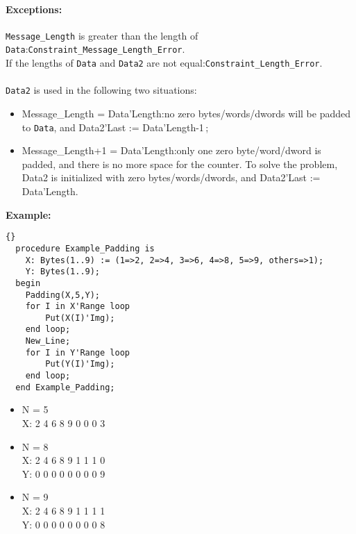 \paragraph{Exceptions:}
\texttt{Message\_Length} is greater than the length of
\texttt{Data}:\quad\texttt{Constraint\_Message\_Length\-\_Error}.\\ If
the lengths of \texttt{Data} and \texttt{Data2} are not
equal:\quad\texttt{Constraint\_Length\_Error}.\\ \ \\ 
\texttt{Data2} is used in the following two situations:
\begin{itemize}
\item Message\_Length = Data'Length:\quad no zero bytes/words/dwords
  will be padded to \texttt{Data}, and Data2'Last := Data'Length-1\,;
\item Message\_Length+1 = Data'Length:\quad only one zero
  byte/word/dword is padded, and there is no more space for the
  counter. To solve the problem, Data2 is initialized with zero
  bytes/words/dwords, and Data2'Last := Data'Length.
\end{itemize}
\textbf{Example:}
\begin{lstlisting}{}
  procedure Example_Padding is
    X: Bytes(1..9) := (1=>2, 2=>4, 3=>6, 4=>8, 5=>9, others=>1);
    Y: Bytes(1..9);
  begin
    Padding(X,5,Y);
    for I in X'Range loop
        Put(X(I)'Img);
    end loop;
    New_Line;
    for I in Y'Range loop
        Put(Y(I)'Img);
    end loop;
  end Example_Padding;
\end{lstlisting}
\begin{itemize}
\item N = 5\\
\qquad X: 2 4 6 8 9 0 0 0 3
\item N = 8\\
\qquad X: 2 4 6 8 9 1 1 1 0\\
\qquad Y: 0 0 0 0 0 0 0 0 9
\item N = 9\\
\qquad X: 2 4 6 8 9 1 1 1 1\\
\qquad Y: 0 0 0 0 0 0 0 0 8
\end{itemize}
